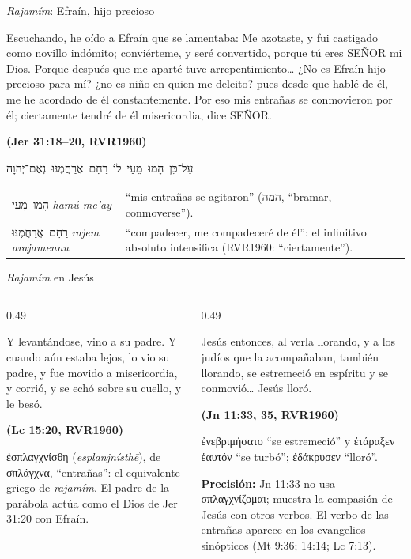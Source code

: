 \documentclass[hyperref={bookmarks=false},aspectratio=169]{beamer}
\newcommand{\heb}[1]{\mbox{\foreignlanguage{hebrew}{#1}}}
\newcommand{\grc}[1]{\foreignlanguage{ancientgreek}{#1}}
\newcommand{\SENOR}{S{\fontsize{0.78em}{1em}\selectfont EÑOR}}
\newcommand{\fuente}[1]{\par\hfill{\upshape\bfseries\footnotesize\textcolor{azul}{#1}}}
\newcommand{\precision}[1]{{\footnotesize\color{gris}\textbf{Precisión:} #1}}
\begin{document}
\begin{frame}{\emph{Rajamím}: Efraín, hijo precioso}
\begin{cita}Escuchando, he oído a Efraín que se lamentaba: Me azotaste, y fui castigado como novillo indómito; conviérteme, y seré convertido, porque tú eres \SENOR{} mi Dios. Porque después que me aparté tuve arrepentimiento\ldots{} ¿No es Efraín hijo precioso para mí? ¿no es niño en quien me deleito? pues desde que hablé de él, me he acordado de él constantemente. Por eso mis entrañas se conmovieron por él; ciertamente tendré de él misericordia, dice \SENOR.\fuente{(Jer 31:18--20, RVR1960)}\end{cita}
\begin{center}\heb{עַל־כֵּן הָמוּ מֵעַי לוֹ רַחֵם אֲרַחֲמֶנּוּ נְאֻם־יְהוָה}\end{center}
\scriptsize\renewcommand{\arraystretch}{1.12}
\begin{tabular}{@{}>{\RaggedRight\arraybackslash}p{2.6cm}>{\RaggedRight\arraybackslash}p{9.2cm}@{}}
\toprule
\heb{הָמוּ מֵעַי} \emph{hamú me'ay} & ``mis entrañas se agitaron'' (\heb{המה}, ``bramar, conmoverse''). \\
\heb{רַחֵם אֲרַחֲמֶנּוּ} \emph{rajem arajamennu} & ``compadecer, me compadeceré de él'': el infinitivo absoluto intensifica (RVR1960: ``ciertamente''). \\
\bottomrule
\end{tabular}
\end{frame}

\begin{frame}{\emph{Rajamím} en Jesús}
\begin{columns}[t,onlytextwidth]
\begin{column}{0.49\textwidth}
\begin{cita}Y levantándose, vino a su padre. Y cuando aún estaba lejos, lo vio su padre, y fue movido a misericordia, y corrió, y se echó sobre su cuello, y le besó.\fuente{(Lc 15:20, RVR1960)}\end{cita}
\scriptsize\grc{ἐσπλαγχνίσθη} (\emph{esplanjnísthē}), de \grc{σπλάγχνα}, ``entrañas'': el equivalente griego de \emph{rajamím}. El padre de la parábola actúa como el Dios de Jer 31:20 con Efraín.
\end{column}
\begin{column}{0.49\textwidth}
\begin{cita}Jesús entonces, al verla llorando, y a los judíos que la acompañaban, también llorando, se estremeció en espíritu y se conmovió\ldots{} Jesús lloró.\fuente{(Jn 11:33, 35, RVR1960)}\end{cita}
\scriptsize\grc{ἐνεβριμήσατο} ``se estremeció'' y \grc{ἐτάραξεν ἑαυτόν} ``se turbó''; \grc{ἐδάκρυσεν} ``lloró''.\par\smallskip
\precision{Jn 11:33 no usa \grc{σπλαγχνίζομαι}; muestra la compasión de Jesús con otros verbos. El verbo de las entrañas aparece en los evangelios sinópticos (Mt 9:36; 14:14; Lc 7:13).}
\end{column}
\end{columns}
\end{frame}
\end{document}
